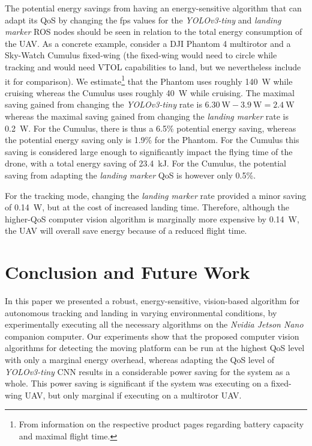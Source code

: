 \documentclass[conference, onecolumn, draftclsnofoot]{IEEEtran}
\begin{document}
The potential energy savings from having an energy-sensitive algorithm
that can adapt its QoS by changing the fps values for the
\emph{YOLOv3-tiny} and \emph{landing marker} ROS nodes should be seen
in relation to the total energy consumption of the UAV. As a concrete
example, consider a DJI Phantom 4 multirotor and a Sky-Watch Cumulus
fixed-wing (the fixed-wing would need to circle while tracking and 
would need VTOL capabilities to land, but we nevertheless include it 
for comparison). We estimate\footnote{From information on the respective
  product pages regarding battery capacity and maximal flight time.}
that the Phantom uses roughly \SI{140}{\watt} while cruising whereas the Cumulus
uses roughly \SI{40}{\watt} while cruising. The maximal saving gained from
changing the \emph{YOLOv3-tiny} rate is 
$\SI{6.30}{\watt}-\SI{3.9}{\watt}=\SI{2.4}{\watt}$ whereas the
maximal saving gained from changing the \emph{landing marker} rate is
\SI{0.2}{\watt}. For the Cumulus, there is thus a 6.5\% potential energy
saving, whereas the potential energy saving only is 1.9\% for the
Phantom. For the Cumulus this saving is considered large enough to
significantly impact the flying time of the drone, with a total energy
saving of \SI{23.4}{\kilo \joule}. For the Cumulus, the potential saving from adapting
the \emph{landing marker} QoS is however only 0.5\%. 

For the tracking mode, changing the \emph{landing marker} rate
provided a minor saving of \SI{0.14}{\watt}, but at the cost of increased
landing time. Therefore, although the higher-QoS computer vision
algorithm is marginally more expensive by \SI{0.14}{\watt}, the UAV will
overall save energy because of a reduced flight time.

\section{Conclusion and Future Work}
\label{sec:conclusion}

In this paper we presented a robust, energy-sensitive, vision-based
algorithm for autonomous tracking and landing in varying environmental
conditions, by experimentally executing all the necessary algorithms on 
the \emph{Nvidia Jetson Nano} companion computer.
%
Our experiments show that the proposed computer vision algorithms for 
detecting the moving platform can be run at the highest QoS level with only a marginal
energy overhead, whereas adapting the QoS level of \emph{YOLOv3-tiny} 
CNN results in a considerable power saving for the system as a whole. 
This power saving is significant if the system was executing on a fixed-wing UAV, %
but only marginal if executing on a multirotor UAV.
\end{document}
